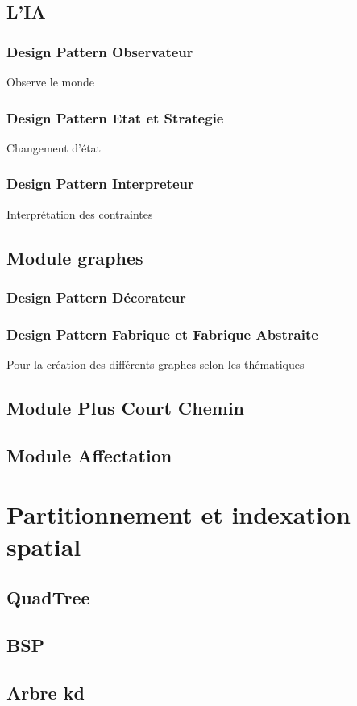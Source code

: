 \subsection{L'IA}
\subsubsection{Design Pattern Observateur}
Observe le monde
\subsubsection{Design Pattern Etat et Strategie}
Changement d'état
\subsubsection{Design Pattern Interpreteur}
Interprétation des contraintes
\subsection{Module graphes}
\subsubsection{Design Pattern Décorateur}
\subsubsection{Design Pattern Fabrique et Fabrique Abstraite}
Pour la création des différents graphes selon les thématiques
\subsection{Module Plus Court Chemin}
\subsection{Module Affectation}

%
\section{Partitionnement et indexation spatial}
\subsection{QuadTree}
\subsection{BSP}
\subsection{Arbre kd}
